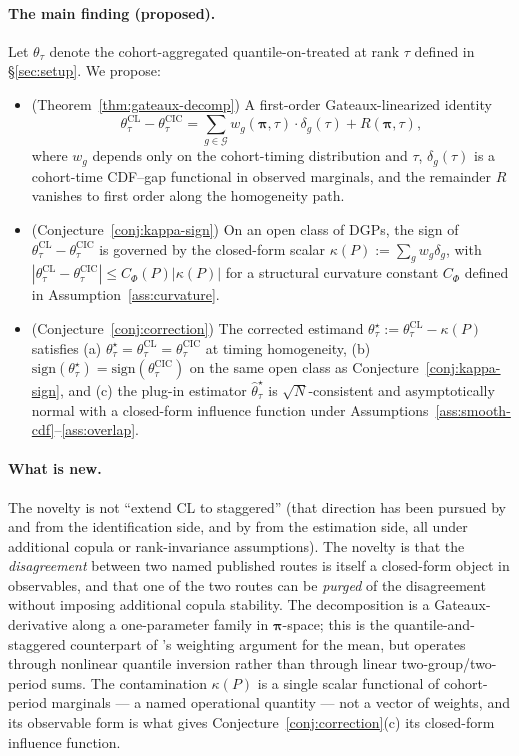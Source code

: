 \documentclass[11pt]{article}
\theoremstyle{definition}
\theoremstyle{plain}
\theoremstyle{remark}
\begin{document}
\paragraph{The main finding (proposed).} Let $\theta_\tau$ denote the cohort-aggregated quantile-on-treated at rank $\tau$ defined in \S\ref{sec:setup}. We propose:
\begin{itemize}
  \item (Theorem~\ref{thm:gateaux-decomp}) A first-order Gateaux-linearized identity
        \[ \theta^{\mathrm{CL}}_\tau - \theta^{\mathrm{CIC}}_\tau = \sum_{g \in \mathcal{G}} w_g(\boldsymbol\pi, \tau) \cdot \delta_g(\tau) + R(\boldsymbol\pi, \tau), \]
        where $w_g$ depends only on the cohort-timing distribution and $\tau$, $\delta_g(\tau)$ is a cohort-time CDF--gap functional in observed marginals, and the remainder $R$ vanishes to first order along the homogeneity path.
  \item (Conjecture~\ref{conj:kappa-sign}) On an open class of DGPs, the sign of $\theta^{\mathrm{CL}}_\tau - \theta^{\mathrm{CIC}}_\tau$ is governed by the closed-form scalar $\kappa(P) := \sum_g w_g \delta_g$, with $|\theta^{\mathrm{CL}}_\tau - \theta^{\mathrm{CIC}}_\tau| \leq C_\Phi(P)|\kappa(P)|$ for a structural curvature constant $C_\Phi$ defined in Assumption~\ref{ass:curvature}.
  \item (Conjecture~\ref{conj:correction}) The corrected estimand $\theta^\star_\tau := \theta^{\mathrm{CL}}_\tau - \kappa(P)$ satisfies (a) $\theta^\star_\tau = \theta^{\mathrm{CL}}_\tau = \theta^{\mathrm{CIC}}_\tau$ at timing homogeneity, (b) $\mathrm{sign}(\theta^\star_\tau) = \mathrm{sign}(\theta^{\mathrm{CIC}}_\tau)$ on the same open class as Conjecture~\ref{conj:kappa-sign}, and (c) the plug-in estimator $\widehat\theta^\star_\tau$ is $\sqrt{N}$-consistent and asymptotically normal with a closed-form influence function under Assumptions~\ref{ass:smooth-cdf}--\ref{ass:overlap}.
\end{itemize}

\paragraph{What is new.} The novelty is not ``extend CL to staggered'' (that direction has been pursued by \citet{LiLin2024} and \citet{Ciaccio2025} from the identification side, and by \citet{KimWooldridge2025} from the estimation side, all under additional copula or rank-invariance assumptions). The novelty is that the \emph{disagreement} between two named published routes is itself a closed-form object in observables, and that one of the two routes can be \emph{purged} of the disagreement without imposing additional copula stability. The decomposition is a Gateaux-derivative along a one-parameter family in $\boldsymbol\pi$-space; this is the quantile-and-staggered counterpart of \citet{GoodmanBacon2021}'s weighting argument for the mean, but operates through nonlinear quantile inversion rather than through linear two-group/two-period sums. The contamination $\kappa(P)$ is a single scalar functional of cohort-period marginals --- a named operational quantity --- not a vector of weights, and its observable form is what gives Conjecture~\ref{conj:correction}(c) its closed-form influence function.
\end{document}
